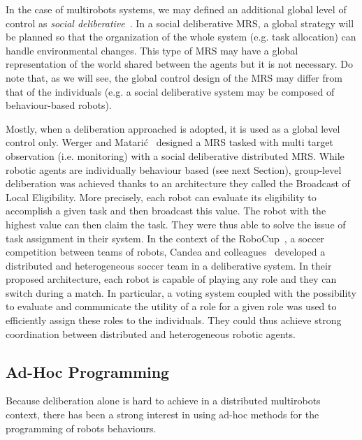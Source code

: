     In the case of multirobots systems, we may defined an additional global level of control as \emph{social deliberative}~\parencite{Iocchi2001}. In a social deliberative MRS, a global strategy will be planned so that the organization of the whole system (e.g. task allocation) can handle environmental changes. This type of MRS may have a global representation of the world shared between the agents but it is not necessary. Do note that, as we will see, the global control design of the MRS may differ from that of the individuals (e.g. a social deliberative system may be composed of behaviour-based robots).

    Mostly, when a deliberation approached is adopted, it is used as a global level control only. Werger and Matarić~\parencite{Werger2000} designed a MRS tasked with multi target observation (i.e. monitoring) with a social deliberative distributed MRS. While robotic agents are individually behaviour based (see next Section), group-level deliberation was achieved thanks to an architecture they called the Broadcast of Local Eligibility. More precisely, each robot can evaluate its eligibility to accomplish a given task and then broadcast this value. The robot with the highest value can then claim the task. They were thus able to solve the issue of task assignment in their system. In the context of the RoboCup~\parencite{Kitano1997}, a soccer competition between teams of robots, Candea and colleagues~\parencite{Candea2001} developed a distributed and heterogeneous soccer team in a deliberative system. In their proposed architecture, each robot is capable of playing any role and they can switch during a match. In particular, a voting system coupled with the possibility to evaluate and communicate the utility of a role for a given role was used to efficiently assign these roles to the individuals. They could thus achieve strong coordination between distributed and heterogeneous robotic agents.


  \subsection{Ad-Hoc Programming} %

    Because deliberation alone is hard to achieve in a distributed multirobots context, there has been a strong interest in using ad-hoc methods for the programming of robots behaviours.

